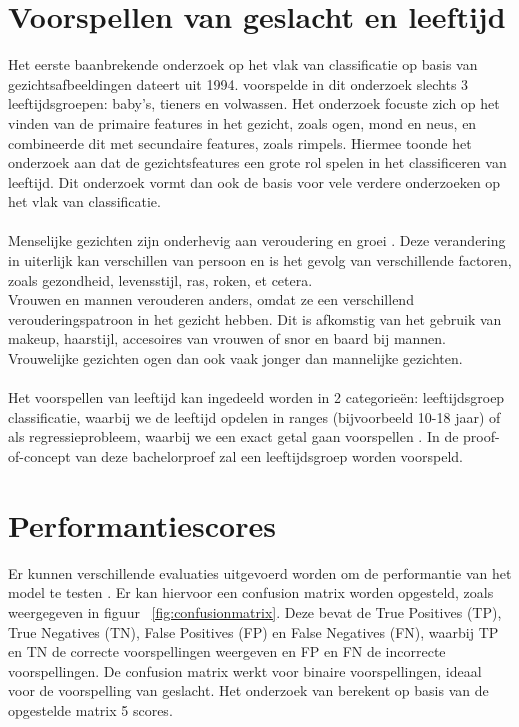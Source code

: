 \section{Voorspellen van geslacht en leeftijd} \label{sec:voorspellen}
Het eerste baanbrekende onderzoek op het vlak van classificatie op basis van gezichtsafbeeldingen dateert uit 1994. \textcite{Kwon1994} voorspelde in dit onderzoek slechts 3 leeftijdsgroepen: baby's, tieners en volwassen. Het onderzoek focuste zich op het vinden van de primaire features in het gezicht, zoals ogen, mond en neus, en combineerde dit met secundaire features, zoals rimpels. Hiermee toonde het onderzoek aan dat de gezichtsfeatures een grote rol spelen in het classificeren van leeftijd. Dit onderzoek vormt dan ook de basis voor vele verdere onderzoeken op het vlak van classificatie.  \\
\\ 
Menselijke gezichten zijn onderhevig aan veroudering en groei \autocite{Gupta2022}. Deze verandering in uiterlijk kan verschillen van persoon en is het gevolg van verschillende factoren, zoals gezondheid, levensstijl, ras, roken, et cetera. \\
Vrouwen en mannen verouderen anders, omdat ze een verschillend verouderingspatroon in het gezicht hebben. Dit is afkomstig van het gebruik van makeup, haarstijl, accesoires van vrouwen of snor en baard bij mannen. Vrouwelijke gezichten ogen dan ook vaak jonger dan mannelijke gezichten. \\
\\
Het voorspellen van leeftijd kan ingedeeld worden in 2 categorieën: leeftijdsgroep classificatie, waarbij we de leeftijd opdelen in ranges (bijvoorbeeld 10-18 jaar) of als regressieprobleem, waarbij we een exact getal gaan voorspellen \autocite{Gupta2022}. In de proof-of-concept van deze bachelorproef zal een leeftijdsgroep worden voorspeld. \\

\section{Performantiescores} \label{sec:performantiescores}
Er kunnen verschillende evaluaties uitgevoerd worden om de performantie van het model te testen \autocite{Sanil2023}. Er kan hiervoor een confusion matrix worden opgesteld, zoals weergegeven in figuur {~\ref{fig:confusionmatrix}}. Deze bevat de True Positives (TP), True Negatives (TN), False Positives (FP) en False Negatives (FN), waarbij TP en TN de correcte voorspellingen weergeven en FP en FN de incorrecte voorspellingen. De confusion matrix werkt voor binaire voorspellingen, ideaal voor de voorspelling van geslacht. Het onderzoek van \textcite{Sanil2023} berekent op basis van de opgestelde matrix 5 scores.

